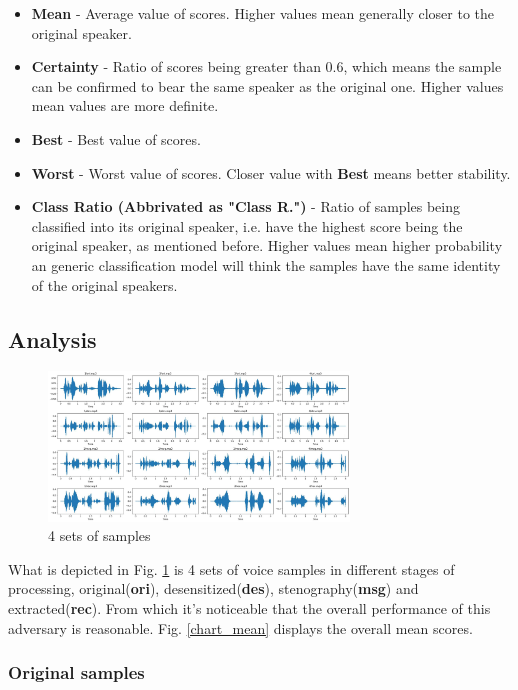 \documentclass[journal]{IEEEtran} %
\begin{document}
\begin{CJK*}{UTF8}{gbsn}
\begin{itemize}
    \item \textbf{Mean} - Average value of scores. Higher values mean generally closer to the original speaker.
    \item \textbf{Certainty} - Ratio of scores being greater than 0.6, which means the sample can be confirmed to bear the same speaker as the original one. Higher values mean values are more definite.
    \item \textbf{Best} - Best value of scores.
    \item \textbf{Worst} - Worst value of scores. Closer value with \textbf{Best} means better stability.
    \item \textbf{Class Ratio (Abbrivated as "Class R.")} - Ratio of samples being classified into its original speaker, i.e. have the highest score being the original speaker, as mentioned before. Higher values mean higher probability an generic classification model will think the samples have the same identity of the original speakers.
\end{itemize}

\subsection{Analysis}

\begin{figure}[htbp]
    \centerline{\includegraphics[width=8cm]{samp_wav.jpg}}
    \caption{4 sets of samples}
    \label{samp1}
\end{figure}

What is depicted in Fig. \ref{samp1} is 4 sets of voice samples in different stages of processing, original(\textbf{ori}), desensitized(\textbf{des}), stenography(\textbf{msg}) and extracted(\textbf{rec}). From which it's noticeable that the overall performance of this adversary is reasonable. Fig. \ref{chart_mean} displays the overall mean scores.
\subsubsection{Original samples}


\end{CJK*}
\end{document}
